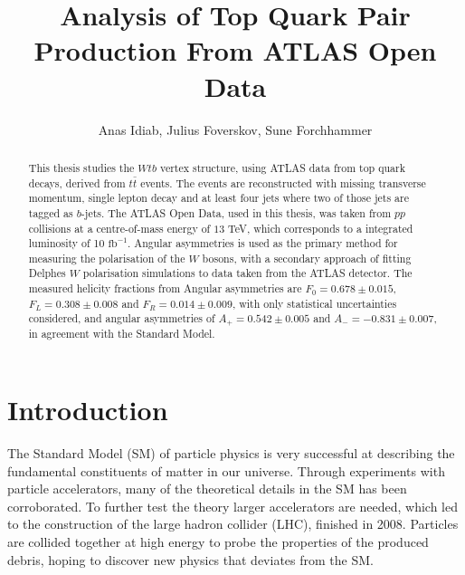 \documentclass[12pt,a4paper]{article}
\title{Analysis of Top Quark Pair Production From ATLAS Open Data}
\author{Anas Idiab, Julius Foverskov, Sune Forchhammer}
\numberwithin{equation}{section}
\begin{document}

\setcounter{page}{1}
\begin{abstract}
  This thesis studies the $Wtb$ vertex structure, using ATLAS data from top
  quark decays, derived from $t\bar t$ events. The events are reconstructed with
  missing transverse momentum, single lepton decay and at least four jets where
  two of those jets are tagged as $b$-jets. The ATLAS Open Data, used in this
  thesis, was taken from $pp$ collisions at a centre-of-mass energy of $13$ TeV,
  which corresponds to a integrated luminosity of 10 $\mathrm{fb}^{-1}$. Angular
  asymmetries is used as the primary method for measuring the polarisation of
  the $W$ bosons, with a secondary approach of fitting Delphes $W$ polarisation
  simulations to data taken from the ATLAS detector. The measured helicity
  fractions from Angular asymmetries are $F_0=0.678 \pm 0.015$,
  $F_L=0.308 \pm 0.008$ and $F_R=0.014 \pm 0.009$, with only statistical
  uncertainties considered, and angular asymmetries of $A_+ = 0.542 \pm 0.005$
  and $A_- = -0.831 \pm 0.007$, in agreement with the Standard Model.

\end{abstract}
\cleardoublepage{}
\tableofcontents{}
\cleardoublepage{}
\setcounter{page}{1}
\section{Introduction}
The Standard Model (SM) of particle physics is very successful at describing the
fundamental constituents of matter in our universe. Through experiments with
particle accelerators, many of the theoretical details in the SM has been
corroborated. To further test the theory larger accelerators are needed, which
led to the construction of the large hadron collider (LHC), finished in 2008.
Particles are collided together at high energy to probe the properties of the
produced debris, hoping to discover new physics that deviates from the SM.\\
\end{document}
